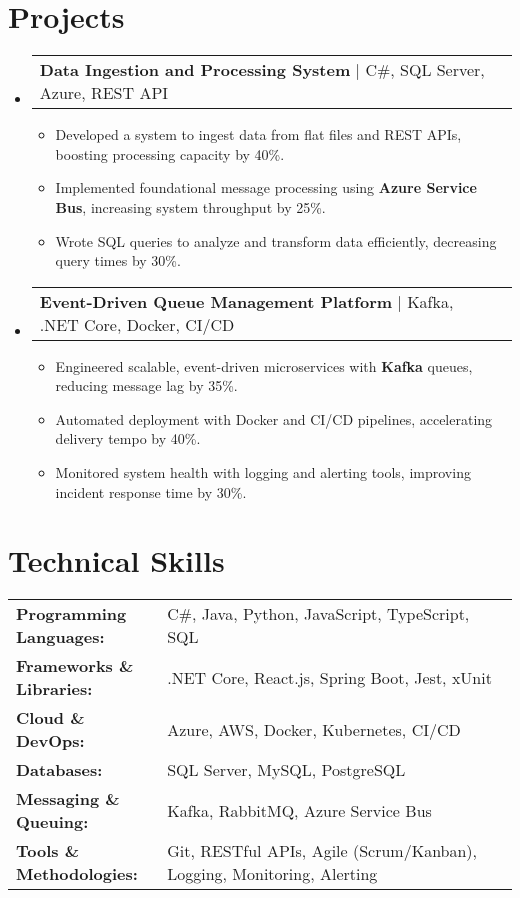 \documentclass[letterpaper,11pt]{article}
\makeatletter
\newcommand{\resumeItem}[1]{
  \item\footnotesize{
    {#1 \vspace{-2pt}}
  }
}
\newcommand{\resumeProjectHeading}[2]{
    \item
    \begin{tabular*}{1.001\textwidth}{l@{\extracolsep{\fill}}r}
      \small#1 & \textbf{\small #2}\\
    \end{tabular*}\vspace{-7pt}
}
\newcommand{\resumeSubHeadingListStart}{\begin{itemize}[leftmargin=0pt, label={}]}
\newcommand{\resumeSubHeadingListEnd}{\end{itemize}}
\newcommand{\resumeItemListStart}{\begin{itemize}[leftmargin=*]}
\newcommand{\resumeItemListEnd}{\end{itemize}\vspace{-5pt}}
\makeatother
\begin{document}
\section{Projects}
    \vspace{-5pt}
    \resumeSubHeadingListStart
      \resumeProjectHeading
          {\textbf{Data Ingestion and Processing System} | C\#, SQL Server, Azure, REST API}{}
          \resumeItemListStart
              \resumeItem{Developed a system to ingest data from flat files and REST APIs, boosting processing capacity by 40\%.}
              \resumeItem{Implemented foundational message processing using \textbf{Azure Service Bus}, increasing system throughput by 25\%.}
              \resumeItem{Wrote SQL queries to analyze and transform data efficiently, decreasing query times by 30\%.}
          \resumeItemListEnd
          \vspace{-16pt}
      \resumeProjectHeading
          {\textbf{Event-Driven Queue Management Platform} | Kafka, .NET Core, Docker, CI/CD}{}
          \resumeItemListStart
              \resumeItem{Engineered scalable, event-driven microservices with \textbf{Kafka} queues, reducing message lag by 35\%.}
              \resumeItem{Automated deployment with Docker and CI/CD pipelines, accelerating delivery tempo by 40\%.}
              \resumeItem{Monitored system health with logging and alerting tools, improving incident response time by 30\%.}
          \resumeItemListEnd
    \resumeSubHeadingListEnd
\vspace{-10pt}
\section{Technical Skills}
        \vspace{-14pt}
        \begin{table}[h]
            \footnotesize
            \begin{tabular}{p{0.3\linewidth} p{0.7\linewidth}}
                \textbf{Programming Languages:} & C\#, Java, Python, JavaScript, TypeScript, SQL \\
                \textbf{Frameworks \& Libraries:} & .NET Core, React.js, Spring Boot, Jest, xUnit \\
                \textbf{Cloud \& DevOps:} & Azure, AWS, Docker, Kubernetes, CI/CD \\
                \textbf{Databases:} & SQL Server, MySQL, PostgreSQL \\
                \textbf{Messaging \& Queuing:} & Kafka, RabbitMQ, Azure Service Bus \\
                \textbf{Tools \& Methodologies:} & Git, RESTful APIs, Agile (Scrum/Kanban), Logging, Monitoring, Alerting \\
            \end{tabular}
        \end{table}
\end{document}
